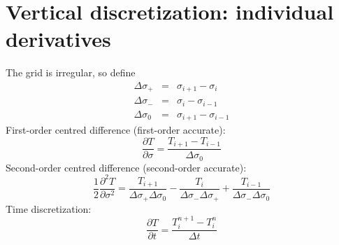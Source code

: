 \documentclass[10pt,english,a4paper]{article}
\begin{document}
\section{Vertical discretization: individual derivatives}
%
The grid is irregular, so define
%
\begin{eqnarray}
\Delta\sigma_{+} & = & \sigma_{i+1}-\sigma_{i}\\
\Delta\sigma_{-} & = & \sigma_{i}-\sigma_{i-1}\\
\Delta\sigma_{0} & = & \sigma_{i+1}-\sigma_{i-1}
\end{eqnarray}
%
First-order centred difference (first-order accurate):
%
\begin{equation}
\frac{\partial T}{\partial \sigma} = \frac{T_{i+1}-T_{i-1}}{\Delta \sigma_0}
\end{equation}
%
Second-order centred difference (second-order accurate):
%
\begin{equation}
\frac{1}{2}\frac{\partial^2 T}{\partial \sigma^2} = \frac{T_{i+1}}{\Delta \sigma_{+}\Delta \sigma_{0}}
-\frac{T_{i}}{\Delta \sigma_{-}\Delta \sigma_{+}}
+\frac{T_{i-1}}{\Delta \sigma_{-}\Delta \sigma_{0}}
\end{equation}
%
Time discretization:
%
\begin{equation}
\frac{\partial T}{\partial t}=\frac{T_{i}^{n+1}-T_{i}^{n}}{\Delta t}
\end{equation}
%
\end{document}
